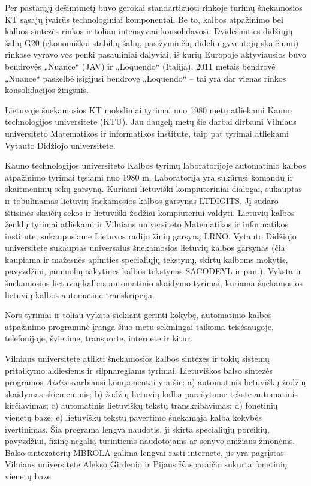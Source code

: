 \documentclass[]{../metanetpaper}
\begin{document}
\begin{multicols}{2}
    Per pastarąjį dešimtmetį buvo gerokai standartizuoti rinkoje turimų šnekamosios KT sąsajų įvairūs technologiniai komponentai. Be to, kalbos atpažinimo bei kalbos sintezės rinkos ir toliau intensyviai konsolidavosi. Dvidešimties didžiųjų šalių G20 (ekonomiškai stabilių šalių, pasižyminčių dideliu gyventojų skaičiumi) rinkose vyravo vos penki pasauliniai dalyviai, iš kurių Europoje aktyviausios buvo bendrovės „Nuance“ (JAV) ir „Loquendo“ (Italija). 2011 metais bendrovė „Nuance“ paskelbė įsigijusi bendrovę „Loquendo“ – tai yra dar vienas rinkos konsolidacijos žingsnis.   

    Lietuvoje šnekamosios KT moksliniai tyrimai nuo 1980 metų atliekami Kauno technologijos universitete (KTU). Jau daugelį metų šie darbai dirbami Vilniaus universiteto Matematikos ir informatikos institute, taip pat tyrimai atliekami Vytauto Didžiojo universitete.   

    Kauno technologijos universiteto Kalbos tyrimų laboratorijoje automatinio kalbos atpažinimo tyrimai tęsiami nuo 1980 m. Laboratorija yra sukūrusi komandų ir skaitmeninių sekų garsyną. Kuriami lietuviški kompiuteriniai dialogai, sukauptas ir tobulinamas lietuvių šnekamosios kalbos garsynas LTDIGITS. Jį sudaro ištisinės skaičių sekos ir lietuviški žodžiai kompiuteriui valdyti. Lietuvių kalbos ženklų tyrimai atliekami ir Vilniaus universiteto Matematikos ir informatikos institute, sukaupusiame Lietuvos radijo žinių garsyną LRNO. Vytauto Didžiojo universitete sukauptas universalus šnekamosios lietuvių kalbos garsynas (čia kaupiama ir mažesnės apimties specialiųjų tekstynų, skirtų kalboms mokytis, pavyzdžiui, jaunuolių sakytinės kalbos tekstynas SACODEYL ir pan.). Vyksta ir šnekamosios lietuvių kalbos automatinio skaidymo tyrimai, kuriama šnekamosios lietuvių kalbos automatinė transkripcija.   

    Nors tyrimai ir toliau vyksta siekiant gerinti kokybę, automatinio kalbos atpažinimo programinė įranga šiuo metu sėkmingai taikoma teisėsaugoje, telefonijoje, švietime, transporte, internete ir kitur.   

    Vilniaus universitete atlikti šnekamosios kalbos sintezės ir tokių sistemų pritaikymo akliesiems ir silpnaregiams tyrimai. Lietuviškos balso sintezės programos \textit{Aistis} svarbiausi komponentai yra šie: a) automatinis lietuviškų žodžių skaidymas skiemenimis; b) žodžių lietuvių kalba parašytame tekste automatinis kirčiavimas; c) automatinis lietuviškų tekstų transkribavimas; d) fonetinių vienetų bazė; e) lietuviškų tekstų pavertimo šnekamąja kalba kokybės įvertinimas. Šia programa lengva naudotis, ji skirta specialiųjų poreikių, pavyzdžiui, fizinę negalią turintiems naudotojams ar senyvo amžiaus žmonėms. Balso sintezatorių MBROLA galima lengvai rasti internete, jis yra pagrįstas Vilniaus universitete Alekso Girdenio ir Pijaus Kasparaičio sukurta fonetinių vienetų baze.   


\end{multicols}
\end{document}

